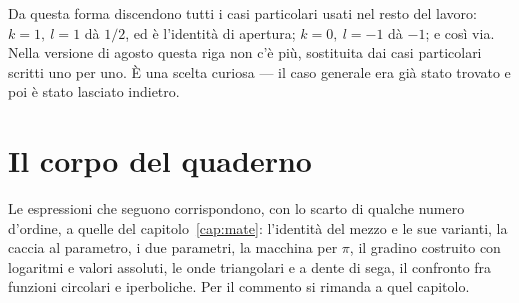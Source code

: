 Da questa forma discendono tutti i casi particolari usati nel resto del lavoro: $k=1,\ l=1$ dà $1/2$, ed è l'identità di apertura; $k=0,\ l=-1$ dà $-1$; e così via. Nella versione di agosto questa riga non c'è più, sostituita dai casi particolari scritti uno per uno. È una scelta curiosa — il caso generale era già stato trovato e poi è stato lasciato indietro.

\section{Il corpo del quaderno}

Le espressioni che seguono corrispondono, con lo scarto di qualche numero d'ordine, a quelle del capitolo~\ref{cap:mate}: l'identità del mezzo e le sue varianti, la caccia al parametro, i due parametri, la macchina per $\pi$, il gradino costruito con logaritmi e valori assoluti, le onde triangolari e a dente di sega, il confronto fra funzioni circolari e iperboliche. Per il commento si rimanda a quel capitolo.

